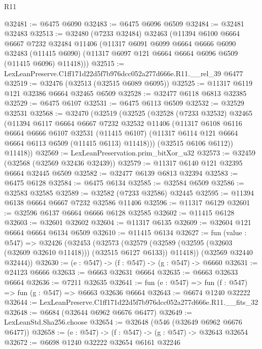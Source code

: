 \begin{lexlean}{R11}
\begin{coremodule}
@32481 := @6475 @6090
@32483 := @6475 @6096 @6509
@32484 := @32481 @32483
@32513 := @32480
    (@7233 @32484)
    @32463
    (@11394
      @6100
      @6664
      @6667
      @7232
      @32484
      @11406
      (@11317
        @6091
        @6099
        @6664
        @6666
        @6090
        @32483
        (@11415 @6090)
        (@11317 @6097 @121 @6664 @6664 @6096 @6509 (@11415 @6096) @11418)))
@32515 := LexLeanPreserve.C1ff171d22d5f7b976dcc052a277d666e.R11.__rel_39 @6477
@32519 := @32476 (@32513 (@32515 @6089 @6095))
@32525 := @11317 @6119 @121 @32386 @6664 @32465 @6509
@32528 := @32477 @6118 @6813 @32385
@32529 := @6475 @6107
@32531 := @6475 @6113 @6509
@32532 := @32529 @32531
@32568 := @32470
    (@32519
      (@32525
        (@32528
          (@7233 @32532)
          @32465
          (@11394
            @6117
            @6664
            @6667
            @7232
            @32532
            @11406
            (@11317
              @6108
              @6116
              @6664
              @6666
              @6107
              @32531
              (@11415 @6107)
              (@11317 @6114 @121 @6664 @6664 @6113 @6509 (@11415 @6113) @11418)))
          (@32515 @6106 @6112))
        @11418))
@32569 := LexLeanPreservation.prim_bitXor_u32
@32573 := @32459 (@32568 (@32569 @32436 @32439))
@32579 := @11317 @6140 @121 @32395 @6664 @32445 @6509
@32582 := @32477 @6139 @6813 @32394
@32583 := @6475 @6128
@32584 := @6475 @6134
@32585 := @32584 @6509
@32586 := @32583 @32585
@32589 := @32582 (@7233 @32586) @32445
@32595 := @11394 @6138 @6664 @6667 @7232 @32586 @11406
@32596 := @11317 @6129
@32601 := @32596 @6137 @6664 @6666 @6128 @32585
@32602 := @11415 @6128
@32603 := @32601 @32602
@32604 := @11317 @6135
@32609 := @32604 @121 @6664 @6664 @6134 @6509
@32610 := @11415 @6134
@32627 := fun (value : @547) =>
  @32426
    (@32453
      (@32573
        (@32579 (@32589 (@32595 (@32603 (@32609 @32610 @11418))) (@32515 @6127 @6133)) @11418))
      (@32569 @32440 @32444))
@32630 := (e : @547) -> (f : @547) -> (g : @547) -> @6660
@32631 := @24123 @6666
@32633 := @6663 @32631 @6664
@32635 := @6663 @32633 @6664
@32636 := @7211 @32635
@32641 := fun (e : @547) => fun (f : @547) => fun (g : @547) => @6663 @32636 @6664
@32643 := @6674 @1240 @32222
@32644 := LexLeanPreserve.C1ff171d22d5f7b976dcc052a277d666e.R11.__fits_32
@32648 := @6684 (@32644 @6962 @6676 @6477)
@32649 := LexLeanStd.Sha256.choose
@32654 := @32648 (@546 (@32649 @6962 @6676 @6477))
@32658 := (e : @547) -> (f : @547) -> (g : @547) -> @32643 @32654
@32672 := @6698
    @1240
    @32222
    @32654
    @6161
    @32246

\end{coremodule}
\end{lexlean}
